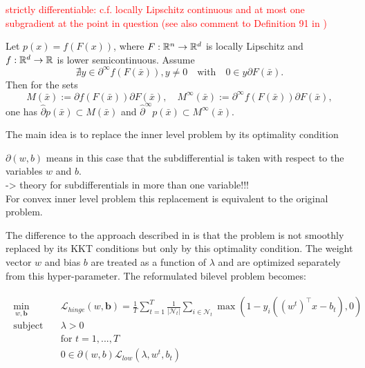 \textcolor{red}{strictly differentiable: c.f. \cite[Theorem 9.17 and 9.18]{Rockafellar2009} locally Lipschitz continuous and at most one subgradient at the point in question (see also comment to Definition 91 in \cite{Rockafellar2009})}

\begin{theorem}
	Let \(p(x) = f(F(x))\), where \(F:\mathbb{R}^n \to \mathbb{R}^d\) is locally Lipschitz and \(f:\mathbb{R}^d \to \mathbb{R}\) is lower semicontinuous. 
	Assume \[\nexists y \in \partial^{\infty}f(F(\bar{x})), y \neq 0 \quad \text{with} \quad 0 \in y \partial F(\bar{x}). \]
	Then for the sets 
	\[ M(\bar{x}):= \partial f(F(\bar{x}))\partial F(\bar{x}), \quad M^{\infty}(\bar{x}):= \partial^{\infty}f(F(\bar{x}))\partial F(\bar{x}), \]
	one has \(\hat{\partial}p(\bar{x}) \subset M(\bar{x})\) and \(\hat{\partial}^{\infty} p(\bar{x}) \subset M^{\infty}(\bar{x})\).
\end{theorem}

The main idea is to replace the inner level problem by its optimality condition


\(\partial(w,b)\) means in this case that the subdifferential is taken with respect to the variables \(w\) and \(b\). \\
-> theory for subdifferentials in more than one variable!!! \\

For convex inner level problem this replacement is equivalent to the original problem.

The difference to the approach described in \cite{Kunapuli2008} is that the problem is not smoothly replaced by its KKT conditions but only by this optimality condition. The weight vector \(w\) and bias \(b\) are treated as a function of \(\lambda\) and are optimized separately from this hyper-parameter.
The reformulated bilevel problem becomes:

\begin{align}
	\begin{split}
	\min_{w,\bm{b}} \quad &  \mathcal{L}_{hinge}(w,\bm{b}) = \frac{1}{T}\sum_{t=1}^T\frac{1}{|\mathcal{N}_t|}\sum_{i \in \mathcal{N}_t}{\max\left(1-y_i((w^t)^{\top}x-b_t),0\right)}\\
	\text{subject to} \quad & \lambda > 0 \\
	& \text{for } t = 1,...,T \\
	& 0 \in \partial(w,b)\mathcal{L}_{low}(\lambda,w^t,b_t) \\
\end{split}
\label{SVM_opt_cond}
\end{align}

